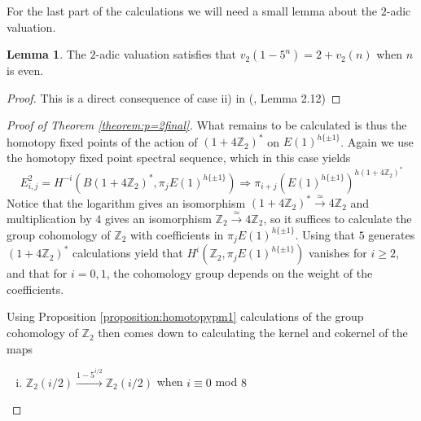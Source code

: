 \documentclass[a4paper]{article} %
\theoremstyle{definition}
\newtheorem{lemma}[theorem]{Lemma}
\newcommand{\toWithMapLong}[1]{\overset{#1}{\longrightarrow}}
\newcommand{\Z}{\mathbb{Z}}
\renewcommand{\implies}{\Rightarrow}    %
\begin{document}
For the last part of the calculations we will need a small lemma about the $2$-adic valuation.

\begin{lemma}\label{lemma:2adicval}
  The $2$-adic valuation satisfies that $v_2(1-5^n) = 2 + v_2(n)$ when $n$ is even.
\end{lemma}
\begin{proof}
This is a direct consequence of case ii) in (\cite{adams}, Lemma 2.12)
\end{proof}

\begin{proof}[Proof of Theorem \ref{theorem:p=2final}]
  What remains to be calculated is thus the homotopy fixed points of the action of $(1 + 4\Z_2)^*$ on $E(1)^{h\{\pm 1\}}$. Again we use the homotopy fixed point spectral sequence, which in this case yields
  \[
  E^2_{i,j} = H^{-i}(B(1+4 \Z_2)^*, \pi_jE(1)^{h\{\pm 1\}}) \implies \pi_{i+j}\left(E(1)^{h\{\pm 1\}}\right)^{h(1 + 4\Z_2)^*}
  \]
  Notice that the logarithm gives an isomorphism $(1+4\Z_2)^*\toWithMapLong{\simeq} 4\Z_2$ and multiplication by $4$ gives an isomorphism $\Z_2 \toWithMapLong{\simeq} 4\Z_2$, so it suffices to calculate the group cohomology of $\Z_2$ with coefficients in $\pi_jE(1)^{h\{\pm 1\}}$. Using that $5$ generates $(1+4\Z_2)^*$ calculations yield that
  $H^i(\Z_2, \pi_jE(1)^{h\{\pm 1\}})$ vanishes for $i \ge 2$, and that for $i =0,1$, the cohomology group depends on the weight of the coefficients.
  \iffalse
  \begin{center}
    \begin{tikzpicture}
    \matrix (m) [matrix of math nodes,
      nodes in empty cells,nodes={minimum width=5ex,
      minimum height=5ex,outer sep=0pt},
      column sep=1ex,row sep=1ex]{
        \cdots & &      &     &     & \\
           \cdots &    &  \Z &  0  & \Z & \\
           \cdots  &   &  \Z  & \Z &  \Z_2(0 )  & \\
      \strut\cdots  &   -2  &  -1  & 0 & \strut \\};
  \draw[thick] (m-1-6.west) -- (m-4-6.west) ;
  \draw[thick] (m-4-1.north) -- (m-4-6.north) ;
  \end{tikzpicture}
  \end{center}
  \fi
   Using Proposition \ref{proposition:homotopypm1} calculations of the group cohomology of $\Z_2$ then comes down to calculating the kernel and cokernel of the maps
  \begin{enumerate}[i)]
    \item $\Z_2(i/2) \toWithMapLong{1-5^{i/2}} \Z_2(i/2)$ when $i \equiv 0$ mod $8$

\end{enumerate}
\end{proof}
\end{document}
